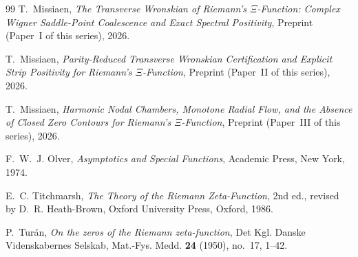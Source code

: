 \documentclass[11pt,reqno,a4paper]{amsart}
\theoremstyle{plain}
\theoremstyle{definition}
\theoremstyle{remark}
\numberwithin{equation}{section}
\begin{document}
\begin{thebibliography}{99}
T.~Missiaen,
\emph{The Transverse Wronskian of Riemann's $\Xi$-Function: Complex Wigner Saddle-Point Coalescence and Exact Spectral Positivity},
Preprint (Paper~I of this series), 2026.

T.~Missiaen,
\emph{Parity-Reduced Transverse Wronskian Certification and Explicit Strip Positivity for Riemann's $\Xi$-Function},
Preprint (Paper~II of this series), 2026.

T.~Missiaen,
\emph{Harmonic Nodal Chambers, Monotone Radial Flow, and the Absence of Closed Zero Contours for Riemann's $\Xi$-Function},
Preprint (Paper~III of this series), 2026.

F.~W.~J. Olver,
\emph{Asymptotics and Special Functions},
Academic Press, New York, 1974.

E.~C. Titchmarsh,
\emph{The Theory of the Riemann Zeta-Function},
2nd ed., revised by D.~R. Heath-Brown, Oxford University Press, Oxford, 1986.

P.~Tur\'an,
\emph{On the zeros of the Riemann zeta-function},
Det Kgl. Danske Videnskabernes Selskab, Mat.-Fys. Medd. \textbf{24} (1950), no.~17, 1--42.

\end{thebibliography}
\end{document}
